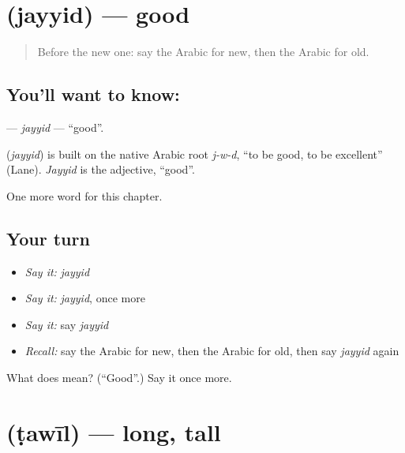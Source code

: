\section[\texorpdfstring{\ar{جيد} (jayyid)}{جيد (jayyid)}]{ (jayyid) — good}

\label{lesson:AR-C82-jayyid}



\begin{quote}
Before the new one: say the Arabic for new, then the Arabic for old.
\end{quote}

\subsection*{You'll want to know: }
\textbf{} — \emph{jayyid} — \textquotedblleft{}good\textquotedblright{}.

\begin{cousinweb}
\textbf{} (\emph{jayyid}) is built on the native Arabic root \emph{j-w-d}, \textquotedblleft{}to be good, to be excellent\textquotedblright{} (Lane). \emph{Jayyid} is the adjective, \textquotedblleft{}good\textquotedblright{}.
\end{cousinweb}

\begin{grammarlens}[title={What you've built}]
One more word for this chapter.
\end{grammarlens}

\subsection*{Your turn}
\begin{itemize}
\raggedright
  \item \emph{Say it:} \emph{jayyid}
  \item \emph{Say it:} \emph{jayyid}, once more
  \item \emph{Say it:} say \emph{jayyid}
  \item \emph{Recall:} say the Arabic for new, then the Arabic for old, then say \emph{jayyid} again
\end{itemize}

\begin{tcolorbox}[breakable,colback=teal!4,colframe=teal!35!black,title={Before you move on}]
What does  mean? (\textquotedblleft{}Good\textquotedblright{}.) Say it once more.
\end{tcolorbox}
\section[\texorpdfstring{\ar{طويل} (ṭawīl)}{طويل (ṭawīl)}]{ (ṭawīl) — long, tall}

